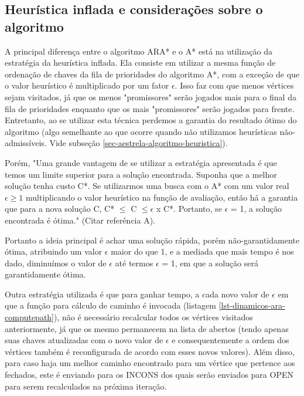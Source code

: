 \subsection{Heurística inflada e considerações sobre o algoritmo}
\label{sec-dinamicos-ad-consideracoes}

A principal diferença entre o algoritmo ARA* e o A* está na utilização da estratégia da heurística inflada. Ela consiste em utilizar a mesma função de ordenação de chaves da fila de prioridades do algoritmo A*, com a exceção de que o valor heurístico é multiplicado por um fator $\epsilon$. Isso faz com que menos vértices sejam visitados, já que os menos "promissores" serão jogados mais para o final da fila de prioridades enquanto que os mais "promissores" serão jogados para frente. Entretanto, ao se utilizar esta técnica perdemos a garantia do resultado ótimo do algoritmo (algo semelhante ao que ocorre quando não utilizamos heurísticas não-admissíveis. Vide subseção \ref{sec-aestrela-algoritmo-heuristica}).

Porém, "Uma grande vantagem de se utilizar a estratégia apresentada é que temos um limite superior para a solução encontrada. Suponha que a melhor solução tenha custo C*. Se utilizarmos uma busca com o A* com um valor real $\epsilon \geq 1$ multiplicando o valor heurístico na função de avaliação, então há a garantia que para a nova solução C, C* $\leq$ C $\leq \epsilon$ x C*. Portanto, se $\epsilon$ = 1, a solução encontrada é ótima." (Citar referência A).

Portanto a ideia principal é achar uma solução rápida, porém não-garantidamente ótima, atribuindo um valor $\epsilon$ maior do que 1, e a mediada que mais tempo é nos dado, diminuímos o valor de $\epsilon$ até termos $\epsilon$ = 1, em que a solução será garantidamente ótima. 

Outra estratégia utilizada é que para ganhar tempo, a cada novo valor de $\epsilon$ em que a função para cálculo de caminho é invocada (listagem \ref{lst-dinamicos-ara-computepath}), não é necessário recalcular todos os vértices visitados anteriormente, já que os mesmo permanecem na lista de abertos (tendo apenas suas chaves atualizadas com o novo valor de $\epsilon$ e consequentemente a ordem dos vértices também é reconfigurada de acordo com esses novos valores). Além disso, para caso haja um melhor caminho encontrado para um vértice que pertence aos fechados, este é enviando para os INCONS dos quais serão enviados para OPEN para serem recalculados na próxima iteração.

